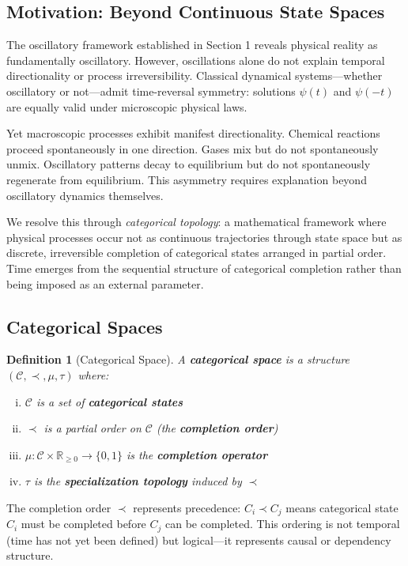 \documentclass[12pt,a4paper]{article}
\newtheorem{definition}{Definition}
\begin{document}
\subsection{Motivation: Beyond Continuous State Spaces}

The oscillatory framework established in Section 1 reveals physical reality as fundamentally oscillatory. However, oscillations alone do not explain temporal directionality or process irreversibility. Classical dynamical systems—whether oscillatory or not—admit time-reversal symmetry: solutions $\psi(t)$ and $\psi(-t)$ are equally valid under microscopic physical laws.

Yet macroscopic processes exhibit manifest directionality. Chemical reactions proceed spontaneously in one direction. Gases mix but do not spontaneously unmix. Oscillatory patterns decay to equilibrium but do not spontaneously regenerate from equilibrium. This asymmetry requires explanation beyond oscillatory dynamics themselves.

We resolve this through \textit{categorical topology}: a mathematical framework where physical processes occur not as continuous trajectories through state space but as discrete, irreversible completion of categorical states arranged in partial order. Time emerges from the sequential structure of categorical completion rather than being imposed as an external parameter.

\subsection{Categorical Spaces}

\begin{definition}[Categorical Space]
\label{def:categorical_space}
A \textbf{categorical space} is a structure $(\mathcal{C}, \prec, \mu, \tau)$ where:
\begin{enumerate}[(i)]
\item $\mathcal{C}$ is a set of \textbf{categorical states}
\item $\prec$ is a partial order on $\mathcal{C}$ (the \textbf{completion order})
\item $\mu: \mathcal{C} \times \mathbb{R}_{\geq 0} \to \{0, 1\}$ is the \textbf{completion operator}
\item $\tau$ is the \textbf{specialization topology} induced by $\prec$
\end{enumerate}
\end{definition}

The completion order $\prec$ represents precedence: $C_i \prec C_j$ means categorical state $C_i$ must be completed before $C_j$ can be completed. This ordering is not temporal (time has not yet been defined) but logical—it represents causal or dependency structure.
\end{document}
